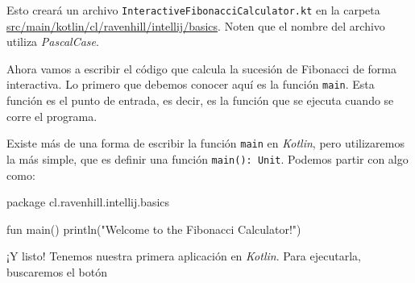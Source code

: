     Esto creará un archivo \texttt{InteractiveFibonacciCalculator.kt} en la carpeta
    \url{src/main/kotlin/cl/ravenhill/intellij/basics}.
    Noten que el nombre del archivo utiliza \textit{PascalCase}.

    Ahora vamos a escribir el código que calcula la sucesión de Fibonacci de forma interactiva.
    Lo primero que debemos conocer aquí es la función \texttt{main}.
    Esta función es el punto de entrada, es decir, es la función que se ejecuta cuando se corre el
    programa.

    Existe más de una forma de escribir la función \texttt{main} en \textit{Kotlin}, pero 
    utilizaremos la más simple, que es definir una función \texttt{main(): Unit}.
    Podemos partir con algo como:

    \begin{kotlin}
      package cl.ravenhill.intellij.basics

      fun main() {
        println("Welcome to the Fibonacci Calculator!")
      }
    \end{kotlin}

    ¡Y listo! 
    Tenemos nuestra primera aplicación en \textit{Kotlin}.
    Para ejecutarla, buscaremos el botón 
